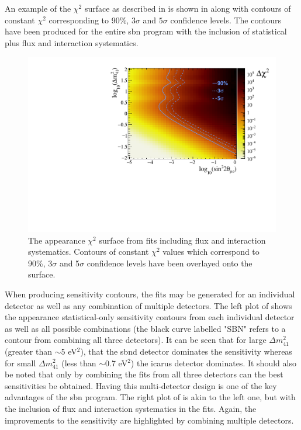 An example of the $\chi^2$ surface as described in  is shown in  along with contours of constant $\chi^2$ corresponding to 90\%, $3\sigma$ and $5\sigma$ confidence levels. The contours have been produced for the entire \gls{sbn} program with the inclusion of statistical plus flux and interaction systematics. 
\begin{figure}[h!]
    \centering
    \includegraphics[width = \largefigwidth]{figures-chap6/exclusion_contours/nue_app_03d1_chi2_surface.pdf}
    \caption[\nue appearance contours overlayed on the $\chi^2$ surface.]{The \nue appearance $\chi^2$ surface from fits including flux and interaction systematics. Contours of constant $\chi^2$ values which correspond to 90\%, 3$\sigma$ and 5$\sigma$ confidence levels have been overlayed onto the surface.}
    \label{fig:nue_app_chisq_surface}
\end{figure}

When producing sensitivity contours, the fits may be generated for an individual detector as well as any combination of multiple detectors. The left plot of  shows the \nue appearance statistical-only sensitivity contours from each individual detector as well as all possible combinations (the black curve labelled "SBN" refers to a contour from combining all three detectors). It can be seen that for large $\Delta m^2_{41}$ (greater than $\sim$5 eV$^2$), that the \gls{sbnd} detector dominates the sensitivity whereas for small $\Delta m^2_{41}$ (less than $\sim$0.7 eV$^2$) the \gls{icarus} detector dominates. It should also be noted that only by combining the fits from all three detectors can the best sensitivities be obtained. Having this multi-detector design is one of the key advantages of the \gls{sbn} program. The right plot of  is akin to the left one, but with the inclusion of flux and interaction systematics in the fits. Again, the improvements to the sensitivity are highlighted by combining multiple detectors. 

